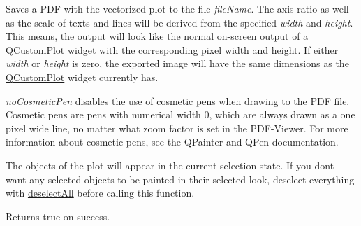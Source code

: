 Saves a P\+DF with the vectorized plot to the file {\itshape file\+Name}. The axis ratio as well as the scale of texts and lines will be derived from the specified {\itshape width} and {\itshape height}. This means, the output will look like the normal on-\/screen output of a \hyperlink{class_q_custom_plot}{Q\+Custom\+Plot} widget with the corresponding pixel width and height. If either {\itshape width} or {\itshape height} is zero, the exported image will have the same dimensions as the \hyperlink{class_q_custom_plot}{Q\+Custom\+Plot} widget currently has.

{\itshape no\+Cosmetic\+Pen} disables the use of cosmetic pens when drawing to the P\+DF file. Cosmetic pens are pens with numerical width 0, which are always drawn as a one pixel wide line, no matter what zoom factor is set in the P\+D\+F-\/\+Viewer. For more information about cosmetic pens, see the Q\+Painter and Q\+Pen documentation.

The objects of the plot will appear in the current selection state. If you don\textquotesingle{}t want any selected objects to be painted in their selected look, deselect everything with \hyperlink{class_q_custom_plot_a9d4808ab925b003054085246c92a257c}{deselect\+All} before calling this function.

Returns true on success.


